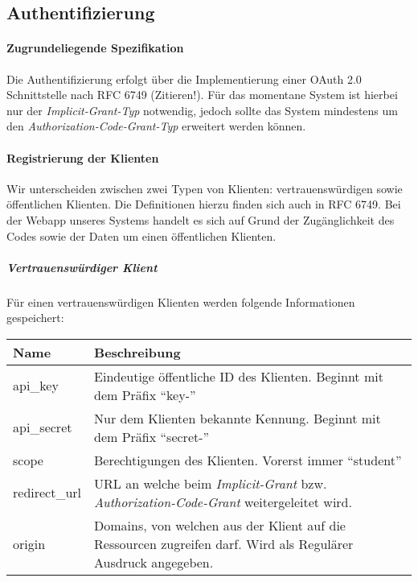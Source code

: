 \subsection{Authentifizierung}
\label{subsec:api-auth}
\paragraph{Zugrundeliegende Spezifikation} Die Authentifizierung erfolgt über die Implementierung einer OAuth 2.0 Schnittstelle nach RFC 6749 (Zitieren!).
Für das momentane System ist hierbei nur der \textit{Implicit-Grant-Typ} notwendig, jedoch sollte das System mindestens um den \textit{Authorization-Code-Grant-Typ} erweitert werden können.
\paragraph{Registrierung der Klienten}
Wir unterscheiden zwischen zwei Typen von Klienten: vertrauenswürdigen sowie öffentlichen Klienten. Die Definitionen hierzu finden sich auch in RFC 6749. Bei der Webapp unseres Systems handelt es sich auf Grund der Zugänglichkeit des Codes sowie der Daten um einen öffentlichen Klienten.
\subparagraph{Vertrauenswürdiger Klient}
Für einen vertrauenswürdigen Klienten werden folgende Informationen gespeichert:\\
\begin{tabularx}{\textwidth}{@{} | X | X | @{}}
	\hline
	\textbf{Name} & \textbf{Beschreibung}\\ \hline \hline
	api\_key & Eindeutige öffentliche ID des Klienten. Beginnt mit dem Präfix \enquote{key-} \\ \hline
	api\_secret & Nur dem Klienten bekannte Kennung. Beginnt mit dem Präfix \enquote{secret-} \\ \hline
	scope & Berechtigungen des Klienten. Vorerst immer \enquote{student} \\ \hline
	redirect\_url & URL an welche beim \textit{Implicit-Grant} bzw. \textit{Authorization-Code-Grant} weitergeleitet wird. \\ \hline
	origin & Domains, von welchen aus der Klient auf die Ressourcen zugreifen darf. Wird als Regulärer Ausdruck angegeben. \\
	\hline
\end{tabularx}

